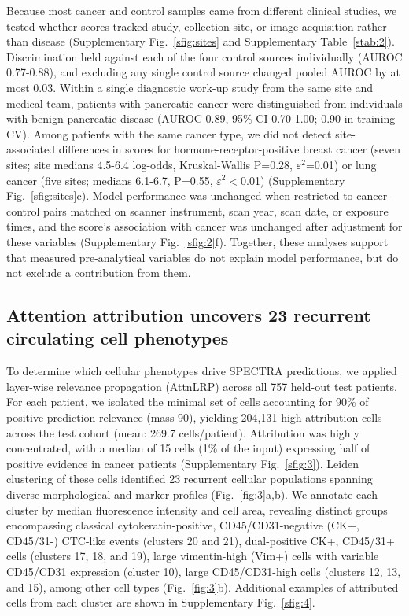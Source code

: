 \documentclass[11pt]{article}
\begin{document}
Because most cancer and control samples came from different clinical studies, we tested whether scores tracked study, collection site, or image acquisition rather than disease (Supplementary Fig.~\ref{sfig:sites} and Supplementary Table~\ref{stab:2}). Discrimination held against each of the four control sources individually (AUROC 0.77-0.88), and excluding any single control source changed pooled AUROC by at most 0.03. Within a single diagnostic work-up study from the same site and medical team, patients with pancreatic cancer were distinguished from individuals with benign pancreatic disease (AUROC 0.89, 95\% CI 0.70-1.00; 0.90 in training CV). Among patients with the same cancer type, we did not detect site-associated differences in scores for hormone-receptor-positive breast cancer (seven sites; site medians 4.5-6.4 log-odds, Kruskal-Wallis P=0.28, $\varepsilon^2$=0.01) or lung cancer (five sites; medians 6.1-6.7, P=0.55, $\varepsilon^2$$<$0.01) (Supplementary Fig.~\ref{sfig:sites}c). Model performance was unchanged when restricted to cancer-control pairs matched on scanner instrument, scan year, scan date, or exposure times, and the score's association with cancer was unchanged after adjustment for these variables (Supplementary Fig.~\ref{sfig:2}f). Together, these analyses support that measured pre-analytical variables do not explain model performance, but do not exclude a contribution from them.

\subsection*{Attention attribution uncovers 23 recurrent circulating cell phenotypes}

To determine which cellular phenotypes drive SPECTRA predictions, we applied layer-wise relevance propagation (AttnLRP) across all 757 held-out test patients\cite{bach2015,achtibat2024}. For each patient, we isolated the minimal set of cells accounting for 90\% of positive prediction relevance (mass-90), yielding 204,131 high-attribution cells across the test cohort (mean: 269.7 cells/patient). Attribution was highly concentrated, with a median of 15 cells (1\% of the input) expressing half of positive evidence in cancer patients (Supplementary Fig.~\ref{sfig:3}). Leiden clustering of these cells identified 23 recurrent cellular populations spanning diverse morphological and marker profiles (Fig.~\ref{fig:3}a,b)\cite{traag2019}. We annotate each cluster by median fluorescence intensity and cell area, revealing distinct groups encompassing classical cytokeratin-positive, CD45/CD31-negative (CK+, CD45/31-) CTC-like events (clusters 20 and 21), dual-positive CK+, CD45/31+ cells (clusters 17, 18, and 19), large vimentin-high (Vim+) cells with variable CD45/CD31 expression (cluster 10), large CD45/CD31-high cells (clusters 12, 13, and 15), among other cell types (Fig.~\ref{fig:3}b). Additional examples of attributed cells from each cluster are shown in Supplementary Fig.~\ref{sfig:4}.
\end{document}
